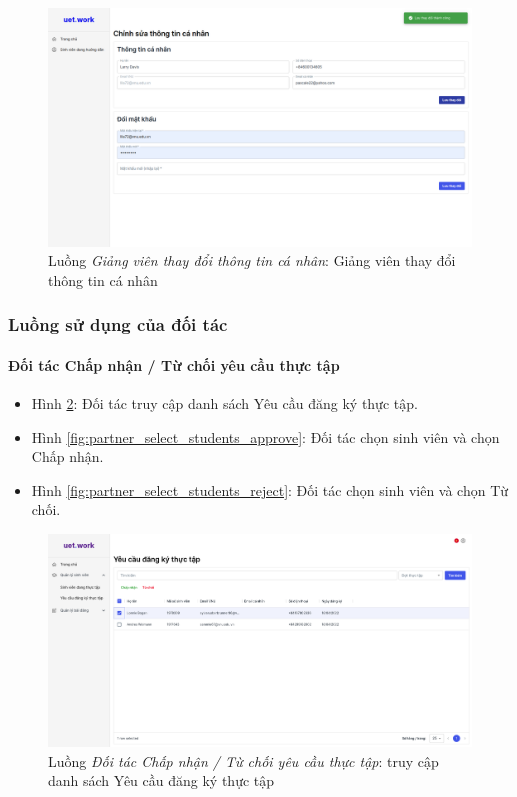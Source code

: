 \documentclass[./../main.tex]{subfiles}
\begin{document}
\begin{figure}[]
	\includegraphics[width=\linewidth]{./images/image52.png}
	\caption{Luồng \emph{Giảng viên thay đổi thông tin cá nhân}: Giảng viên thay đổi thông tin cá nhân}
	\label{fig:lecturer_edit_info}
\end{figure}

\subsubsection{Luồng sử dụng của đối tác}

\paragraph*{Đối tác Chấp nhận / Từ chối yêu cầu thực tập}

\begin{itemize}
	\item Hình \ref{fig:partner_list_requests_page}: Đối tác truy cập danh sách Yêu cầu đăng ký thực tập.
	\item Hình \ref{fig:partner_select_students_approve}: Đối tác chọn sinh viên và chọn Chấp nhận.
	\item Hình \ref{fig:partner_select_students_reject}: Đối tác chọn sinh viên và chọn Từ chối.
\end{itemize}

\begin{figure}[]
	\includegraphics[width=\linewidth]{./images/image29.png}
	\caption{Luồng \emph{Đối tác Chấp nhận / Từ chối yêu cầu thực tập}: truy cập danh sách Yêu cầu đăng ký thực tập}
	\label{fig:partner_list_requests_page}
\end{figure}
\end{document}
